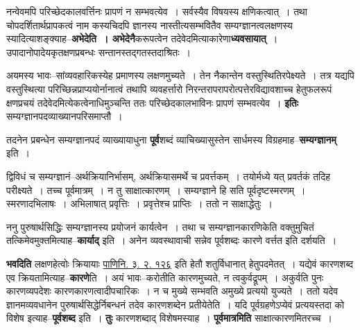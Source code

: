 \documentclass[article,12pt,a4paper]{memoir}
\begin{document}
	  \pstart नन्वेवमपि परिच्छेदकालवर्त्तिनः प्रापणं न सम्भवत्येव । सर्वस्यैव विषयस्य क्षणिकत्वात् । तथा चोपदर्शितार्थप्रापकत्वं नाम कस्यचिदपि ज्ञानस्य नास्तीत्यसम्भवितैव सम्यग्ज्ञानत्वलक्षणस्य स्यादित्याशङ्क्याह--\textbf{अभेदेति । अभेदेनै}करूपत्वेन तदेवेदमित्याकारेणा\textbf{ध्यवसायात्} । उपादानोपादेयकृतक्षणप्रबन्धः सन्तानस्तद्गतस्तदाश्रितः ।
	\pend
      

	  \pstart अयमस्य भावः--सांव्यवहारिकस्येह प्रमाणस्य लक्षणमुच्यते । तेन नैकान्तेन वस्तुस्थितिरपेक्ष्यते । तत्र यद्यपि वस्तुस्थित्या परिच्छिन्नप्राप्ययोर्नानात्वं तथापि व्यवहर्त्तारो निरन्तरापरापरोत्पत्तेरविद्यावशाच्च हेतुफलरूपं क्षणप्रचयं तदेवेदमित्येकत्वेनाधिमुञ्चन्ति ततः परिच्छेदकालभाविनः प्रापणं सम्भवत्येव । \textbf{इतिः} सम्यग्ज्ञानपदव्याख्यानपरिसमाप्तौ ।
	\pend
      

	  \pstart तदनेन प्रबन्धेन सम्यग्ज्ञानपदं व्याख्यायाधुना \textbf{पूर्व}शब्दं व्याचिख्यासुस्तेन सार्धमस्य विग्रहमाह--\textbf{सम्यग्ज्ञानम्} इति ।
	\pend
	  \bigskip
	  \begingroup
	

	  \pstart {}द्विविधं च सम्यग्ज्ञानं--अर्थक्रियानिर्भासम्, अर्थक्रियासमर्थे च प्रवर्त्तकम् । तयोर्मध्ये यत् प्रवर्तकं तदिह परीक्ष्यते । तच्च पूर्वमात्रम् । न तु साक्षात्कारणम् । सम्यग्ज्ञाने हि सति पूर्वदृष्टस्मरणम् । स्मरणादभिलाषः । अभिलाषात् प्रवृत्तिः । प्रवृत्तेश्च प्राप्तिः । ततो न साक्षाद्धेतुः ।
	\pend
      
	  \endgroup
	

	  \pstart ननु पुरुषार्थसिद्धिः सम्यग्ज्ञानस्य प्रयोजनं कार्यत्वेन । तथा च सम्यग्ज्ञानकारणिकेति वक्तुमुचितं तत्किमेवमुक्तमित्याह--\textbf{कार्याद्} इति । अनेन व्यवस्थावाची सन्नेव पूर्वशब्दः कारणे वर्त्तत इति दर्शयति ।
	\pend
      

	  \pstart \textbf{भवदिति} लक्षणहेत्वोः क्रियायाः \href{http://sarit.indology.info/?cref=Pā.3.2.126}{पाणिनि. ३. २. १२६} इति हेतौ शतुर्विधानात् हेतुपदमेतत् । यद्येवं कारणशब्द एव क्रियतामित्याह--\textbf{कारणे}ति । अयं भावः--करोतीति कारणमुच्यते, न त्वकुर्वद्रूपम् । अकुर्वति पुनः कारणव्यपदेशः कारणकारणत्वादीपचारिकः । न च मुख्ये सम्भवति अमुख्ये प्रत्ययो युज्यते । ततो यदेव ज्ञानमव्यवधानेन पुरुषार्थसिद्धेर्निबन्धनं तदेव कारणशब्देन प्रतीयेतेति । यदि पूर्वग्रहणेऽप्येवं प्रत्ययस्तदा को विशेष इत्याह--\textbf{पूर्वशब्द} इति । \textbf{तुः} कारणशब्दाद् विशेषमस्याह । \textbf{पूर्वमात्रमिति} साक्षात्कारणमितरच्च ।
	\pend
      
\end{document}
